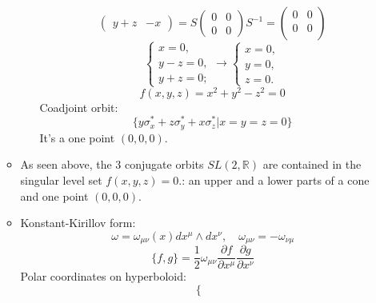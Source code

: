 \documentclass[12pt]{article}
\theoremstyle{definition}
\begin{document}
\begin{enumerate}
\begin{itemize}
\begin{enumerate}
\begin{equation}
\begin{pmatrix}
            y+z & -x
        \end{pmatrix}=
        S \begin{pmatrix}
            0 & 0\\
            0 & 0
        \end{pmatrix}  S^{-1}= 
        \begin{pmatrix}
            0 & 0\\
            0 & 0\\
        \end{pmatrix}
        \end{equation}
        \begin{equation}
            \begin{cases}
                x=0,\\
                y-z=0,\\
                y+z=0;
            \end{cases}\rightarrow\begin{cases}
                x=0,\\
                y=0,\\
                z=0.
            \end{cases}
        \end{equation}
        \begin{equation}
            f(x,y,z)=x^2+y^2-z^2=0
        \end{equation}
        Coadjoint orbit:
        \begin{equation}
            \{y\sigma^*_x+z\sigma^*_y+x\sigma^*_z|x=y=z=0\}
        \end{equation}
        It's a one point $(0,0,0)$.
\end{enumerate}
\item As seen above, the 3 conjugate orbits $SL(2,\mathbb{R})$ are contained in the singular level set $f(x,y,z)=0.$: an upper and a lower parts of a cone and one point $(0,0,0)$.
\item Konstant-Kirillov form:
\begin{equation}
    \omega=\omega_{\mu\nu}(x)dx^\mu\wedge dx^\nu,\quad\omega_{\mu\nu}=-\omega_{\nu\mu}
\end{equation}
\begin{equation}
    \{f,g\}=\frac{1}{2}\omega_{\mu\nu}\frac{\partial f}{\partial x^\mu}\frac{\partial g}{\partial x^\nu}
\end{equation}
Polar coordinates on hyperboloid:
\begin{equation}
    \begin{cases}

\end{cases}
\end{equation}
\end{itemize}
\end{enumerate}
\end{document}
